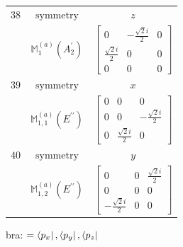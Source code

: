 \documentclass[fleqn,8pt,landscape]{jsarticle}
\begin{document}
\begin{longtable}{ccc}
$ 38 $ & $ \text{symmetry} $ & $ z $ \\
$  $ & $ \mathbb{M}_{1}^{(a)}(A_{2}^{\prime}) $ & $ \begin{bmatrix} 0 & - \frac{\sqrt{2} i}{2} & 0 \\ \frac{\sqrt{2} i}{2} & 0 & 0 \\ 0 & 0 & 0 \end{bmatrix} $ \\ \hline
$ 39 $ & $ \text{symmetry} $ & $ x $ \\
$  $ & $ \mathbb{M}_{1,1}^{(a)}(E^{\prime\prime}) $ & $ \begin{bmatrix} 0 & 0 & 0 \\ 0 & 0 & - \frac{\sqrt{2} i}{2} \\ 0 & \frac{\sqrt{2} i}{2} & 0 \end{bmatrix} $ \\ \hline
$ 40 $ & $ \text{symmetry} $ & $ y $ \\
$  $ & $ \mathbb{M}_{1,2}^{(a)}(E^{\prime\prime}) $ & $ \begin{bmatrix} 0 & 0 & \frac{\sqrt{2} i}{2} \\ 0 & 0 & 0 \\ - \frac{\sqrt{2} i}{2} & 0 & 0 \end{bmatrix} $ \\ \hline
\end{longtable}
bra: $=\bra{p_{x}}, \bra{p_{y}}, \bra{p_{z}}$
\end{document}
